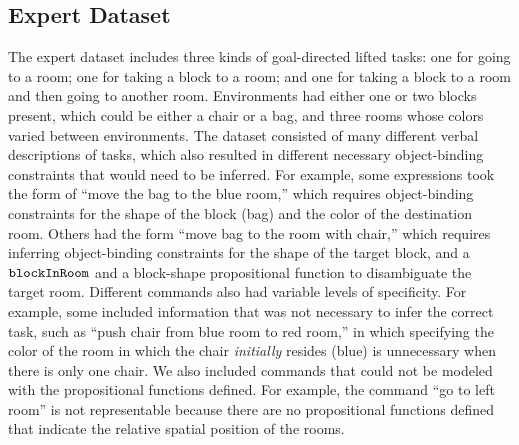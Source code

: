\documentclass[conference]{IEEEtran}
\begin{document}


\subsection{Expert Dataset}
The expert dataset includes three kinds of goal-directed lifted tasks: one for going to a room; one for taking a block to a room; and one for taking a block to a room and then going to another room. Environments had either one or two blocks present, which could be either a chair or a bag, and three rooms whose colors varied between environments. The dataset consisted of many different verbal descriptions of tasks, which also resulted in different necessary object-binding constraints that would need to be inferred. 
For example, some expressions took the form of ``move the bag to the blue room,'' which requires object-binding constraints for the shape of the block (bag) and the color of the destination room. Others had the form ``move bag to the room with chair,''
which requires inferring object-binding constraints for the shape of the target block, and a ${\tt blockInRoom}$ and a block-shape propositional function to disambiguate the target room. Different commands also had variable levels of specificity. For example, some included information that was not necessary to infer the correct task, such as ``push chair from blue room to red room,'' in which specifying the color of the room in which the chair {\em initially} resides (blue) is unnecessary when there is only one chair. We also included commands that could not be modeled with the propositional functions defined. For example, the command ``go to left room'' is not representable because there are no propositional functions defined that indicate the relative spatial position of the rooms.%
\end{document}
